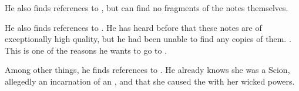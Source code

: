 He also finds references to , but can find no fragments of the notes themselves. 

He also finds references to . 
He has heard before that these notes are of exceptionally high quality, but he had been unable to find any copies of them. 
. 
This is one of the reasons he wants to go to \Redce. 

Among other things, he finds references to \Belzir. 
He already knows she was a Scion, allegedly an incarnation of an  \malach, and that she caused the \HundredScourges with her wicked \malach powers. 









